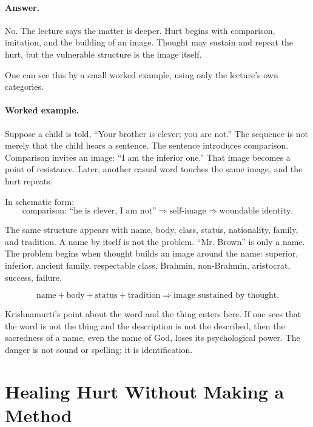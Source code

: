 \paragraph{Answer.}
No. The lecture says the matter is deeper. Hurt begins with comparison, imitation, and the building of an image. Thought may sustain and repeat the hurt, but the vulnerable structure is the image itself.

One can see this by a small worked example, using only the lecture's own categories.

\paragraph{Worked example.}
Suppose a child is told, ``Your brother is clever; you are not.'' The sequence is not merely that the child hears a sentence. The sentence introduces comparison. Comparison invites an image: ``I am the inferior one.'' That image becomes a point of resistance. Later, another casual word touches the same image, and the hurt repeats.

In schematic form:
\begin{equation}
\text{comparison: ``he is clever, I am not''}
\Rightarrow
\text{self-image}
\Rightarrow
\text{woundable identity}.
\end{equation}

The same structure appears with name, body, class, status, nationality, family, and tradition. A name by itself is not the problem. ``Mr. Brown'' is only a name. The problem begins when thought builds an image around the name: superior, inferior, ancient family, respectable class, Brahmin, non-Brahmin, aristocrat, success, failure.

\begin{equation}
\text{name}+\text{body}+\text{status}+\text{tradition}
\Rightarrow
\text{image sustained by thought}.
\end{equation}

Krishnamurti's point about the word and the thing enters here. If one sees that the word is not the thing and the description is not the described, then the sacredness of a name, even the name of God, loses its psychological power. The danger is not sound or spelling; it is identification.

\section{Healing Hurt Without Making a Method}

